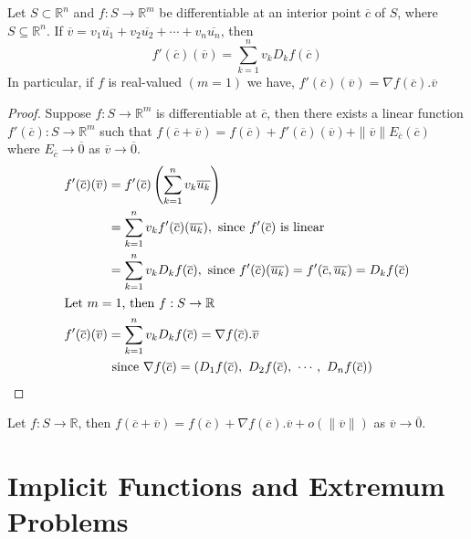 \begin{theorem}
	Let $S \subset \mathbb{R}^n$ and $f : S \to \mathbb{R}^m$ be differentiable at an interior point $\overline{c}$ of $S$, where $S \subseteq \mathbb{R}^n$. If $\overline{v} = v_1\overline{u_1}+v_2\overline{u_2} + \cdots + v_n\overline{u_n}$, then
	\[ f'(\overline{c})(\overline{v}) = \sum_{k=1}^n v_k D_k f(\overline{c}) \]
	In particular, if $f$ is real-valued $(m = 1)$ we have, $f'(\overline{c})(\overline{v}) = \nabla{}f(\overline{c}).\overline{v}$
\end{theorem}
\begin{proof}
	Suppose $f : S \to \mathbb{R}^m$ is differentiable at $\overline{c}$, then there exists a linear function $f'(\overline{c}) : S \to \mathbb{R}^m$ such that $f(\overline{c}+\overline{v}) = f(\overline{c}) + f'(\overline{c})(\overline{v}) + \|\overline{v}\| E_{\overline{c}}(\overline{c})$ where $E_{\overline{c}} \to \overline{0}$ as $\overline{v} \to \overline{0}$.
	\begin{align*}
		f'(\overline{c})(\overline{v}) & = f'(\overline{c})\left(\sum_{k=1}^n v_k \overline{u_k}\right)\\
			& = \sum_{k=1}^n v_k f'(\overline{c})(\overline{u_k}), \text{ since $f'(\overline{c})$ is linear}\\
			& = \sum_{k=1}^n v_k D_k f(\overline{c}), \text{ since $f'(\overline{c})(\overline{u_k}) = f'(\overline{c},\overline{u_k}) = D_k f(\overline{c})$}\\
		\intertext{Let $m = 1$, then $f : S \to \mathbb{R}$ }
		f'(\overline{c})(\overline{v}) & = \sum_{k=1}^n v_k D_k f(\overline{c}) = \nabla{}f(\overline{c}).\overline{v}\\
		& \text{ since } \nabla{}f(\overline{c}) = \left( D_1f(\overline{c}),\ D_2f(\overline{c}),\ \cdots ,\ D_nf(\overline{c}) \right)
	\end{align*}
\end{proof}

\begin{remark}
	Let $f : S \to \mathbb{R}$, then $f(\overline{c}+\overline{v}) = f(\overline{c}) + \nabla{}f(\overline{c}).\overline{v} + o(\|\overline{v}\|)$ as $\overline{v} \to \overline{0}$.
\end{remark}
\chapter{Implicit Functions and Extremum Problems}

